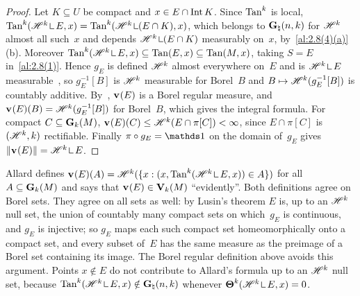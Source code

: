 \begin{proof}
    Let $K \subseteq U$ be compact and $x \in E \cap \operatorname{Int} K$. Since $\operatorname{Tan}^{k}$ is local,
    $\Tan^{\vdim}(\HM^{\vdim} \restrict E, x) = \Tan^{\vdim}(\HM^{\vdim} \restrict (E \cap K), x)$,
    which belongs to $\mathbf{G}_{\natural}(n,k)$ for $\mathscr{H}^{k}$ almost all such~$x$ and depends
    $\HM^{\vdim} \restrict (E \cap K)$ measurably on~$x$, by~\ref{al:2.8(4)(a)}(b). Moreover
    $\Tan^{\vdim}(\HM^{\vdim} \restrict E, x) \subseteq \Tan(E,x) \subseteq \Tan(M,x)$, taking $S =
    E$ in~\ref{al:2.8(1)}. Hence $g_E$ is defined $\mathscr{H}^{k}$ almost everywhere on~$E$ and is
    $\HM^{\vdim} \restrict E$ measurable~\cite[2.3.2]{Federer1969}, so $g_E^{-1}[B]$ is
    $\mathscr{H}^{k}$ measurable for Borel~$B$ and $B \mapsto \mathscr{H}^{k}(g_E^{-1}[B])$ is countably
    additive. By~\cite[2.2.3]{Federer1969}, $\mathbf{v}_{}(E)$ is a Borel regular measure, and
    $\mathbf{v}_{}(E)(B) = \mathscr{H}^{k}(g_E^{-1}[B])$ for Borel~$B$, which gives the integral formula. For
    compact $C \subseteq \mathbf{G}_{k}(M)$, $\mathbf{v}_{}(E)(C) \le \mathscr{H}^{k}(E \cap \pi[C]) < \infty$, since
    $E \cap \pi[C]$ is $(\mathscr{H}^{k},k)$ rectifiable. Finally $\pi \circ g_E = \id{}$ on the
    domain of~$g_E$ gives $\|\var{}(E)\| = \HM^{\vdim} \restrict E$.
\end{proof}

\begin{remark}
    \label{rem:3.5}
    Allard defines $\var{}(E)(A) = \HM^{\vdim}(\{ x : (x, \Tan^{\vdim}(\HM^{\vdim} \restrict E,x))
    \in A \})$ for all $A \subseteq \mathbf{G}_{k}(M)$ and says that $\mathbf{v}_{}(E) \in \mathbf{V}_{k}(M)$
    ``evidently''. Both definitions agree on Borel sets. They agree on all sets as well: by
    Lusin's theorem $E$ is, up to an $\mathscr{H}^{k}$ null set, the union of countably many compact
    sets on which~$g_E$ is continuous, and $g_E$ is injective; so $g_E$ maps each such compact
    set homeomorphically onto a compact set, and every subset of~$E$ has the same measure as the
    preimage of a Borel set containing its image. The Borel regular definition above avoids
    this argument. Points $x \notin E$ do not contribute to Allard's formula up to an
    $\mathscr{H}^{k}$ null set, because $\Tan^{\vdim}(\HM^{\vdim} \restrict E, x) \notin
    \pgrass{\adim}{\vdim}$ whenever $\density^{\vdim}(\HM^{\vdim} \restrict E, x) = 0$.
\end{remark}

